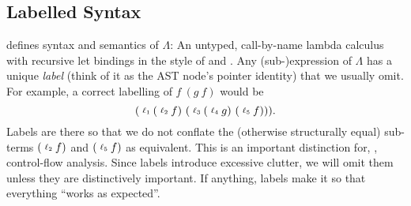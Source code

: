 %
%
%
%
%
%
%
%
%

\subsection{Labelled Syntax}

 defines syntax and semantics of $Λ$: An untyped,
call-by-name lambda calculus with recursive let bindings in the style of
\citep{Launchbury:93} and \citep{Sestoft:97}.
Any (sub-)expression of $Λ$ has a unique \emph{label} (think of it as the AST node's
pointer identity) that we usually omit. For example, a correct labelling of
$f~(g~f)$ would be
\[
  (\slbln{1} (\slbln{2} f)~(\slbln{3}(\slbln{4} g)~(\slbln{5} f))).
\]
Labels are there so that we do not conflate the (otherwise structurally equal)
sub-terms $(\slbln{2} f)$ and $(\slbln{5} f)$ as equivalent. This is an important
distinction for, \eg, control-flow analysis. Since labels introduce excessive
clutter, we will omit them unless they are distinctively important. If anything,
labels make it so that everything ``works as expected''.

